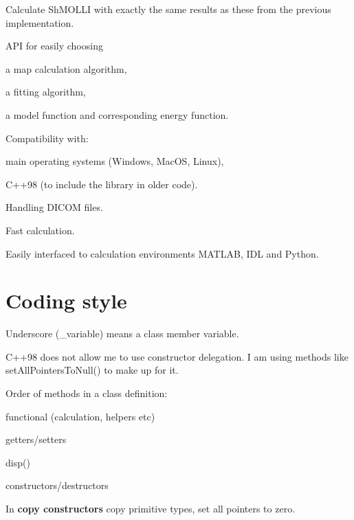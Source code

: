 \begin{DoxyEnumerate}
\item Calculate Sh\-M\-O\-L\-L\-I with exactly the same results as these from the previous implementation.
\item A\-P\-I for easily choosing
\begin{DoxyItemize}
\item a map calculation algorithm,
\item a fitting algorithm,
\item a model function and corresponding energy function.
\end{DoxyItemize}
\item Compatibility with\-:
\begin{DoxyItemize}
\item main operating systems (Windows, Mac\-O\-S, Linux),
\item C++98 (to include the library in older code).
\end{DoxyItemize}
\item Handling D\-I\-C\-O\-M files.
\item Fast calculation.
\item Easily interfaced to calculation environments M\-A\-T\-L\-A\-B, I\-D\-L and Python.
\end{DoxyEnumerate}

\section*{Coding style}


\begin{DoxyItemize}
\item Underscore ({\ttfamily \-\_\-variable}) means a class member variable.
\item C++98 does not allow me to use constructor delegation. I am using methods like {\ttfamily set\-All\-Pointers\-To\-Null()} to make up for it.
\item Order of methods in a class definition\-:
\begin{DoxyItemize}
\item functional (calculation, helpers etc)
\item getters/setters
\item disp()
\item constructors/destructors
\end{DoxyItemize}
\item In {\bfseries copy constructors} copy primitive types, set all pointers to zero.
\end{DoxyItemize}

